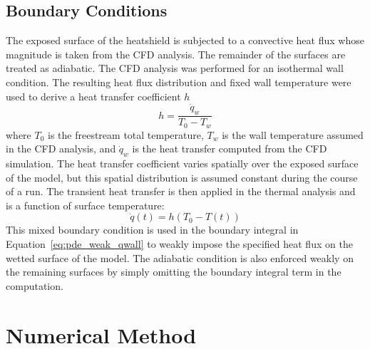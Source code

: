 \subsection{Boundary Conditions\label{sec:bcs}}
The exposed surface of the heatshield is subjected to a convective heat flux whose magnitude is taken from the CFD analysis.  The remainder of the surfaces are treated as adiabatic.  The CFD analysis was performed for an isothermal wall condition.  The resulting heat flux distribution and fixed wall temperature were used to derive a heat transfer coefficient $h$ 
\begin{equation}
  h = \frac{\dot{q}_w}{T_0 - T_w}
\end{equation}
where $T_0$ is the freestream total temperature, $T_w$ is the wall temperature assumed in the CFD analysis, and $\dot{q}_w$ is the heat transfer computed from the CFD simulation.  The heat transfer coefficient varies spatially over the exposed surface of the model, but this spatial distribution is assumed constant during the course of a run.  The transient heat transfer is then applied in the thermal analysis and is a function of surface temperature:
\begin{equation}
  \dot{q}\left(t\right) = h \left(T_0 - T\left(t\right)\right)
\end{equation}
This mixed boundary condition is used in the boundary integral in Equation~\eqref{eq:pde_weak_qwall} to weakly impose the specified heat flux on the wetted surface of the model.  The adiabatic condition is also enforced weakly on the remaining surfaces by simply omitting the boundary integral term in the computation.



\section{Numerical Method}
